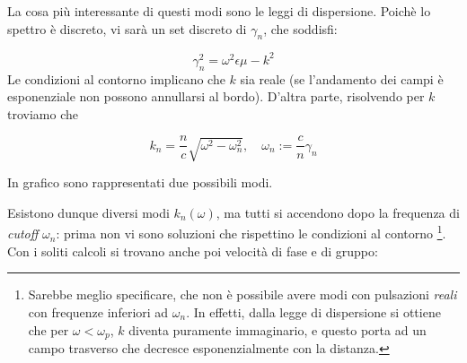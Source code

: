 \documentclass{report}
\begin{document}
    La cosa più interessante di questi modi sono le leggi di dispersione. Poichè lo spettro è discreto, vi sarà un set discreto di $\gamma_n$, che soddisfi: 

    \begin{equation}
        \gamma_n^2 = \omega^2\epsilon\mu - k^2
    \end{equation}
    Le condizioni al contorno implicano che $k$ sia reale (se l'andamento dei campi è esponenziale non possono annullarsi al bordo). D'altra parte, risolvendo per $k$ troviamo che 
 
    \begin{equation}
        k_n = \frac{n}{c}\sqrt{\omega^2 - \omega_n^2}, \quad \omega_n := \frac{c}{n}\gamma_n
    \end{equation}

    \begin{center}
    \end{center}

    In grafico sono rappresentati due possibili modi. 

    Esistono dunque diversi modi $k_n(\omega)$, ma tutti si accendono dopo la frequenza di \emph{cutoff} $\omega_n$: prima non vi sono soluzioni che rispettino le condizioni al contorno \footnote{Sarebbe meglio specificare, che non è possibile avere modi con pulsazioni \emph{reali} con frequenze inferiori ad \(\omega_n\). In effetti, dalla legge di dispersione si ottiene che per \(\omega < \omega_p\), \(k\) diventa puramente immaginario, e questo porta ad un campo trasverso che decresce esponenzialmente con la distanza.}. Con i soliti calcoli si trovano anche poi velocità di fase e di gruppo: 
\end{document}
